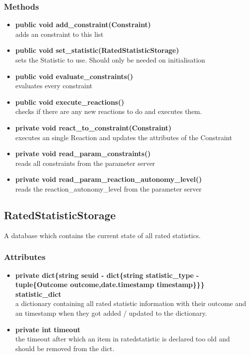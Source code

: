 \subsubsection{Methods}
\begin{itemize}
	\item \textbf{ public void add\_constraint(Constraint)  }\\
		adds an constraint to this list
	\item \textbf{ public void set\_statistic(RatedStatisticStorage)  }\\
		sets the Statistic to use. Should only be needed on initialisation
	\item \textbf{ public void evaluate\_constraints()  }\\
		evaluates every constraint
	\item \textbf{ public void execute\_reactions()  }\\
		checks if there are any new reactions to do and executes them.
	\item \textbf{ private void react\_to\_constraint(Constraint)  }\\
		executes an single Reaction and updates the attributes of the Constraint
	\item \textbf{ private void read\_param\_constraints()  }\\
		reads all constraints from the parameter server
	\item \textbf{ private void read\_param\_reaction\_autonomy\_level()  }\\
		reads the reaction\_autonomy\_level from the parameter server
\end{itemize}


\subsection{RatedStatisticStorage}
A database which contains the current state of all rated statistics.
\subsubsection{Attributes}
\begin{itemize}
	\item \textbf{ private dict\{string seuid - dict\{string statistic\_type - tuple\{Outcome outcome,date.timestamp timestamp\}\}\} statistic\_dict }\\
		a dictionary containing all rated statistic information with their outcome and an timestamp when they got added / updated to the dictionary.
	\item \textbf{ private int timeout }\\
		the timeout after which an item in ratedstatistic is declared too old and should be removed from the dict.
\end{itemize}
